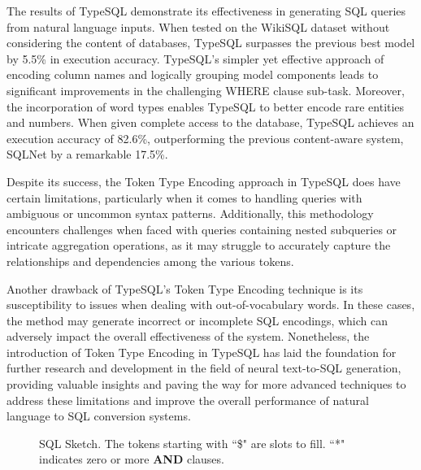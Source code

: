 The results of TypeSQL demonstrate its effectiveness in generating SQL queries from natural language inputs. When tested on the WikiSQL dataset without considering the content of databases, TypeSQL surpasses the previous best model by 5.5\% in execution accuracy. TypeSQL's simpler yet effective approach of encoding column names and logically grouping model components leads to significant improvements in the challenging WHERE clause sub-task. Moreover, the incorporation of word types enables TypeSQL to better encode rare entities and numbers. When given complete access to the database, TypeSQL achieves an execution accuracy of 82.6\%, outperforming the previous content-aware system, SQLNet by a remarkable 17.5\%.

Despite its success, the Token Type Encoding approach in TypeSQL does have certain limitations, particularly when it comes to handling queries with ambiguous or uncommon syntax patterns. Additionally, this methodology encounters challenges when faced with queries containing nested subqueries or intricate aggregation operations, as it may struggle to accurately capture the relationships and dependencies among the various tokens.

Another drawback of TypeSQL's Token Type Encoding technique is its susceptibility to issues when dealing with out-of-vocabulary words. In these cases, the method may generate incorrect or incomplete SQL encodings, which can adversely impact the overall effectiveness of the system. Nonetheless, the introduction of Token Type Encoding in TypeSQL has laid the foundation for further research and development in the field of neural text-to-SQL generation, providing valuable insights and paving the way for more advanced techniques to address these limitations and improve the overall performance of natural language to SQL conversion systems.

\begin{figure}[!t]
    \centering
    \caption{\centering SQL Sketch. The tokens starting with ``\$" are slots to fill. ``*" indicates zero or more \textbf{AND} clauses.\cite{DBLP:journals/corr/abs-1804-09769}}
    \label{fig:sql_sketch}
\end{figure}